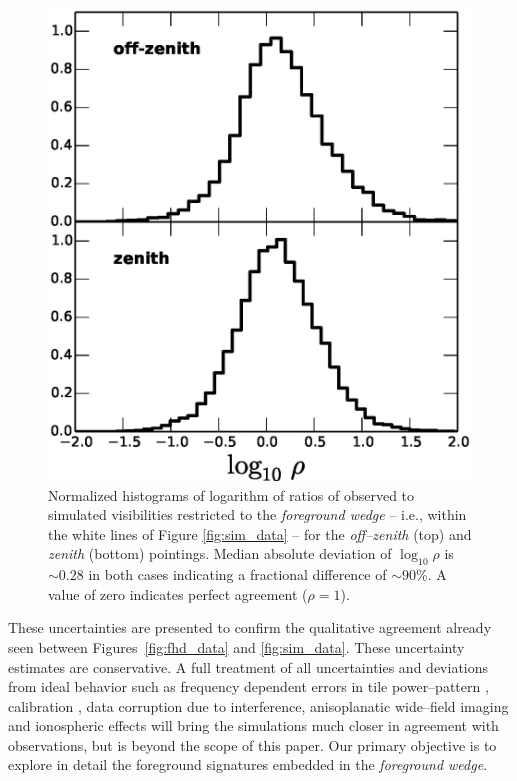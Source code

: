 \documentclass[preprint2,iop,numberedappendix]{emulateapj}
\begin{document}
\begin{figure}[htb]
\centering
\includegraphics[width=\linewidth]{figures/v1_0/delta_array_histogram_wedge_sim_data_log_ratio_0.3m_ground_custom_gaussian_FG_model_asm_all_sky_nside_64_Tsys_95.0K_185.0_MHz_30.7_MHz_bhw2.0.eps}
\caption{Normalized histograms of logarithm of ratios of observed to simulated visibilities restricted to the {\it foreground wedge} -- i.e., within the white lines of Figure \ref{fig:sim_data} -- for the {\it off--zenith} (top) and {\it zenith} (bottom) pointings. Median absolute deviation of $\log_{10}\rho$ is $\sim 0.28$ in both cases indicating a fractional difference of $\sim 90$\%. A value of zero indicates perfect agreement ($\rho=1$). \label{fig:data-sim-ratio}}
\end{figure}

These uncertainties are presented to confirm the qualitative agreement already seen between Figures~\ref{fig:fhd_data} and \ref{fig:sim_data}. These uncertainty estimates are conservative. A full treatment of all uncertainties and deviations from ideal behavior such as frequency dependent errors in tile power--pattern \citep{ber14}, calibration \citep{dat10}, data corruption due to interference, anisoplanatic wide--field imaging and ionospheric effects \citep{int09} will bring the simulations much closer in agreement with observations, but is beyond the scope of this paper. Our primary objective is to explore in detail the foreground signatures embedded in the {\it foreground wedge}.
\end{document}
